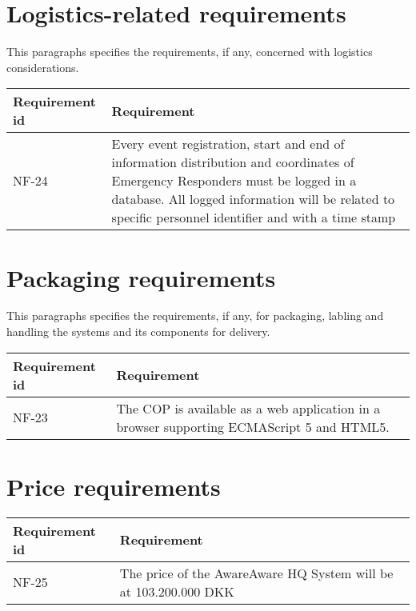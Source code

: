 


\section{Logistics-related requirements}
This paragraphs specifies the requirements, if  any, concerned with logistics considerations.

\begin{longtable}{| p{3.2cm} |  p{10cm} | }
	\hline
	\textbf{Requirement id} &  \textbf{Requirement } \\
	\hline
	NF-24 & Every event registration, start and end of information distribution and coordinates of Emergency Responders must be logged in a database. All logged information will be related to specific personnel identifier and with a time stamp  \\
	\hline
\end{longtable}

\newpage
\label{sec_nonFunc7}
\section{Packaging requirements}
This paragraphs specifies the requirements, if any, for packaging, labling and handling the systems and its components for delivery.

\begin{longtable}{| p{3.2cm} |  p{10cm} | }
	\hline
	\textbf{Requirement id} &  \textbf{Requirement } \\
	\hline
	NF-23 & The COP is available as a web application in a browser supporting ECMAScript 5 and HTML5. \\
	\hline
\end{longtable}

\section{Price requirements}

\begin{longtable}{| p{3.2cm} |  p{10cm} | }
	\hline
	\textbf{Requirement id} &  \textbf{Requirement } \\
	\hline
	NF-25 & The price of the AwareAware HQ System will be at 103.200.000 DKK  \\
	\hline
\end{longtable}